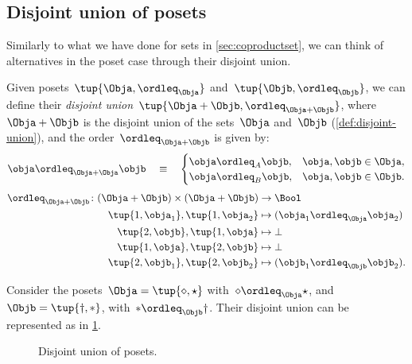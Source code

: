 \subsection{Disjoint union of posets}

Similarly to what we have done for sets in \cref{sec:coproductset}, we can think of alternatives in the poset case through their disjoint union.

\begin{definition}
    Given posets~$\tup{\Obja, \ordleq_\Obja}$ and~$\tup{\Objb, \ordleq_\Objb}$, we can define their \emph{disjoint union}~$\tup{\Obja + \Objb, \ordleq_{\Obja + \Objb}}$, where~$\Obja + \Objb$
    is the disjoint union of the sets~$\Obja$ and~$\Objb$ (\cref{def:disjoint-union}), and the
    order~$\ordleq_{\Obja + \Objb}$ is given by:
    \begin{equation}
        \obja \ordleq_{\Obja + \Obja} \objb \quad\equiv\quad
        \begin{cases}
            \obja \ordleq_A \objb, & \obja,\objb \in \Obja, \\
            \obja \ordleq_B \objb, & \obja,\objb \in \Objb.
        \end{cases}
    \end{equation}
    \begin{equation}
        \begin{aligned}
            \ordleq_{\Obja+\Objb}\colon (\Obja+\Objb)\times (\Obja+\Objb)&\to \Bool\\
            \tup{1,\obja_1},\tup{1,\obja_2}&\mapsto (\obja_1\ordleq_{\Obja} \obja_2)\\
            \tup{2,\objb},\tup{1,\obja}&\mapsto \bot\\
            \tup{1,\obja},\tup{2,\objb}&\mapsto \bot\\
            \tup{2,\objb_1},\tup{2,\objb_2}&\mapsto (\objb_1\ordleq_\Objb \objb_2).
        \end{aligned}
    \end{equation}
\end{definition}


\begin{example}
    Consider the posets~$\Obja=\tup{\diamond, \star}$ with~$\diamond \ordleq_\Obja \star$, and~$\Objb=\tup{\dagger,\ast}$, with~$\ast \ordleq_\Objb \dagger$. Their disjoint union can be represented as in \cref{fig:poset-coproduct}.

    \begin{figure}[h!]
        \centering
        \caption{Disjoint union of posets. \label{fig:poset-coproduct}}
    \end{figure}
\end{example}
